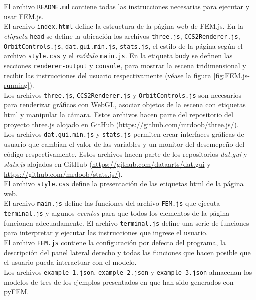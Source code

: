 El archivo \verb|README.md| contiene todas las instrucciones necesarias para ejecutar y usar FEM.js.\\

El archivo \verb|index.html| define la estructura de la página web de FEM.js. En la \emph{etiqueta} \verb|head| se define la ubicación los archivos \verb|three.js|, \verb|CCS2Renderer.js|, \verb|OrbitControls.js|, \verb|dat.gui.min.js|, \verb|stats.js|, el estilo de la página según el archivo \verb|style.css| y el \emph{módulo} \verb|main.js|. En la etiqueta \verb|body| se definen las secciones \verb|renderer-output| y \verb|console|, para mostrar la escena tridimensional y recibir las instrucciones del usuario respectivamente (véase la figura \ref{fig:FEM.js-running}).\\

Los archivos \verb|three.js|, \verb|CCS2Renderer.js| y \verb|OrbitControls.js| son necesarios para renderizar gráficos con WebGL, asociar objetos de la escena con etiquetas html y manipular la cámara. Estos archivos hacen parte del repositorio del proyecto three.js alojado en GitHub (\url{https://github.com/mrdoob/three.js/}).\\

Los archivos \verb|dat.gui.min.js| y \verb|stats.js| permiten crear interfaces gráficas de usuario que cambian el valor de las variables y un monitor del desemepeño del código respectivamente. Estos archivos hacen parte de los repositorios \emph{dat.gui} y \emph{stats.js} alojados en GitHub (\url{https://github.com/dataarts/dat.gui} y \url{https://github.com/mrdoob/stats.js/}).\\

El archivo \verb|style.css| define la presentación de las etiquetas html de la página web.\\

El archivo \verb|main.js| define las funciones del archivo \verb|FEM.js| que ejecuta \verb|terminal.js| y algunos \emph{eventos} para que todos los elementos de la página funcionen adecuadamente. El archivo \verb|terminal.js| define una serie de funciones para interpretar y ejecutar las instrucciones que ingrese el usuario.\\

El archivo \verb|FEM.js| contiene la configuración por defecto del programa, la descripción del panel lateral derecho y todas las funciones que hacen posible que el usuario pueda interactuar con el modelo.\\

Los archivos \verb|example_1.json|, \verb|example_2.json| y \verb|example_3.json| almacenan los modelos de tres de los ejemplos presentados en \cite{escamilla1995microcomputadores} que han sido generados con pyFEM.\\

